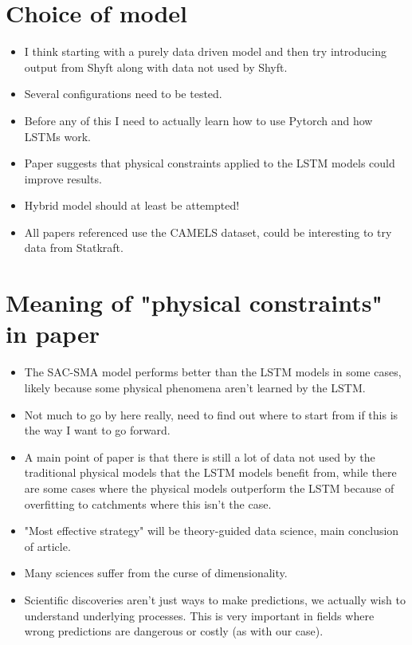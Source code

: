 \documentclass[a4paper,12pt,english]{article}
\begin{document}
\section*{Choice of model}
\begin{itemize}
\item I think starting with a purely data driven model and then try introducing output from Shyft along with data not used by Shyft.
\item Several configurations need to be tested.
\item Before any of this I need to actually learn how to use Pytorch and how LSTMs work.
\item Paper \cite{lstm_third_paper} suggests that physical constraints applied to the LSTM models could improve results.
\item Hybrid model should at least be attempted!
\item All papers referenced use the CAMELS dataset, could be interesting to try data from Statkraft.
\end{itemize}

\section*{Meaning of "physical constraints" in paper \cite{lstm_third_paper}}
\begin{itemize}
\item The SAC-SMA model performs better than the LSTM models in some cases, likely because some physical phenomena aren't learned by the LSTM. 
\item Not much to go by here really, need to find out where to start from if this is the way I want to go forward.
\item A main point of paper \cite{lstm_third_paper} is that there is still a lot of data not used by the traditional physical models that the LSTM models benefit from, while there are some cases where the physical models outperform the LSTM because of overfitting to catchments where this isn't the case.
\item "Most effective strategy" will be theory-guided data science, main conclusion of article.
\item Many sciences suffer from the curse of dimensionality.
\item Scientific discoveries aren't just ways to make predictions, we actually wish to understand underlying processes. This is very important in fields where wrong predictions are dangerous or costly (as with our case).
\end{itemize}
\end{document}
